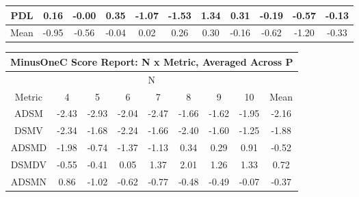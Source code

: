 \documentclass[11pt,a4paper]{report}
\begin{document}
\begin{longtable}{ | c || c | c | c | c | c | c | c | c | c || c |}
PDL &  \cellcolor[HTML]{F7F7FF} 0.16 &  \cellcolor[HTML]{FFFFFF} -0.00 &  \cellcolor[HTML]{F7F7FF} 0.35 &  \cellcolor[HTML]{FFE7E7} -1.07 &  \cellcolor[HTML]{FFD7D7} -1.53 &  \cellcolor[HTML]{DFDFFF} 1.34 &  \cellcolor[HTML]{F7F7FF} 0.31 &  \cellcolor[HTML]{FFF7F7} -0.19 &  \cellcolor[HTML]{FFEFEF} -0.57 &  \cellcolor[HTML]{FFFFFF} -0.13 \\
\hline
\hline
Mean  &  \cellcolor[HTML]{FFE7E7} -0.95 &  \cellcolor[HTML]{FFEFEF} -0.56 &  \cellcolor[HTML]{FFFFFF} -0.04 &  \cellcolor[HTML]{FFFFFF} 0.02 &  \cellcolor[HTML]{F7F7FF} 0.26 &  \cellcolor[HTML]{F7F7FF} 0.30 &  \cellcolor[HTML]{FFF7F7} -0.16 &  \cellcolor[HTML]{FFEFEF} -0.62 &  \cellcolor[HTML]{FFDFDF} -1.20 &  \cellcolor[HTML]{FFF7F7} -0.33 \\
\hline
\end{longtable}
\begin{longtable}{ | c || c | c | c | c | c | c | c || c |}
\hline
\multicolumn{9}{|c|}{ MinusOneC Score Report: N x Metric, Averaged Across P } \\
\hline
\multicolumn{9}{|c|}{ N } \\
\hline
Metric & 4 & 5 & 6 & 7 & 8 & 9 & 10 & Mean\\
\hline
\hline
\endhead
ADSM &  \cellcolor[HTML]{FFBFBF} -2.43 &  \cellcolor[HTML]{FFB7B7} -2.93 &  \cellcolor[HTML]{FFCFCF} -2.04 &  \cellcolor[HTML]{FFBFBF} -2.47 &  \cellcolor[HTML]{FFD7D7} -1.66 &  \cellcolor[HTML]{FFD7D7} -1.62 &  \cellcolor[HTML]{FFCFCF} -1.95 &  \cellcolor[HTML]{FFC7C7} -2.16 \\
DSMV &  \cellcolor[HTML]{FFC7C7} -2.34 &  \cellcolor[HTML]{FFD7D7} -1.68 &  \cellcolor[HTML]{FFC7C7} -2.24 &  \cellcolor[HTML]{FFD7D7} -1.66 &  \cellcolor[HTML]{FFBFBF} -2.40 &  \cellcolor[HTML]{FFD7D7} -1.60 &  \cellcolor[HTML]{FFDFDF} -1.25 &  \cellcolor[HTML]{FFCFCF} -1.88 \\
ADSMD &  \cellcolor[HTML]{FFCFCF} -1.98 &  \cellcolor[HTML]{FFEFEF} -0.74 &  \cellcolor[HTML]{FFDFDF} -1.37 &  \cellcolor[HTML]{FFDFDF} -1.13 &  \cellcolor[HTML]{F7F7FF} 0.34 &  \cellcolor[HTML]{F7F7FF} 0.29 &  \cellcolor[HTML]{E7E7FF} 0.91 &  \cellcolor[HTML]{FFEFEF} -0.52 \\
DSMDV &  \cellcolor[HTML]{FFEFEF} -0.55 &  \cellcolor[HTML]{FFF7F7} -0.41 &  \cellcolor[HTML]{FFFFFF} 0.05 &  \cellcolor[HTML]{DFDFFF} 1.37 &  \cellcolor[HTML]{CFCFFF} 2.01 &  \cellcolor[HTML]{DFDFFF} 1.26 &  \cellcolor[HTML]{DFDFFF} 1.33 &  \cellcolor[HTML]{EFEFFF} 0.72 \\
ADSMN &  \cellcolor[HTML]{E7E7FF} 0.86 &  \cellcolor[HTML]{FFE7E7} -1.02 &  \cellcolor[HTML]{FFEFEF} -0.62 &  \cellcolor[HTML]{FFEFEF} -0.77 &  \cellcolor[HTML]{FFEFEF} -0.48 &  \cellcolor[HTML]{FFEFEF} -0.49 &  \cellcolor[HTML]{FFFFFF} -0.07 &  \cellcolor[HTML]{FFF7F7} -0.37 \\

\end{longtable}
\end{document}
